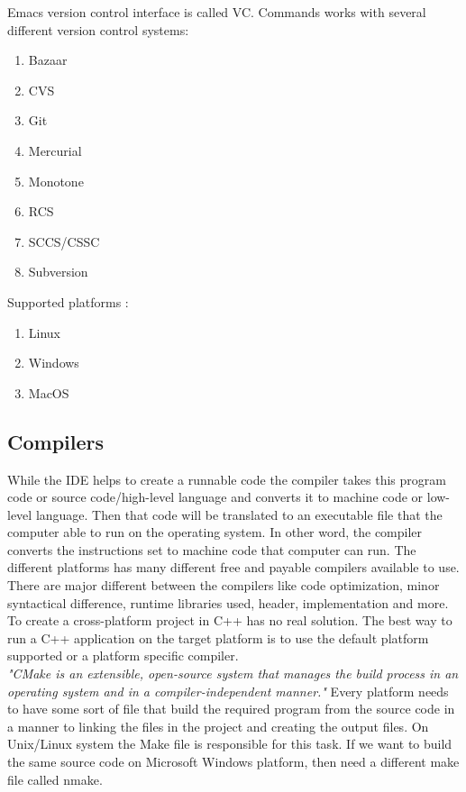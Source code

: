 \documentclass[12pt]{article}
\begin{document}
{{\begin{enumerate}
Emacs version control interface is called VC. Commands works with several different version control systems:
\begin{enumerate}
\item Bazaar
\item CVS
\item Git
\item Mercurial
\item Monotone
\item RCS
\item SCCS/CSSC
\item Subversion
\end{enumerate} 

Supported platforms : 
\begin{enumerate}
\item Linux
\item Windows
\item MacOS
\end{enumerate}

\end{enumerate}
}

\subsection{Compilers}
While the IDE helps to create a runnable code the compiler takes this program code or source code/high-level language and converts it to machine code or low-level language. Then that code will be translated to an executable file that the computer able to run on the operating system. In other word, the compiler converts the instructions set to machine code that computer can run. The different platforms has many different free and payable compilers available to use. There are  major different between the compilers like code optimization, minor syntactical difference, runtime libraries used, header, implementation and more.\cite{Bolton}\\

To create a cross-platform project in C++ has no real solution. The best way to run a C++ application on the target platform is to use the default platform supported or a platform specific compiler.\\

\textit{"CMake is an extensible, open-source system that manages the build process in an operating system and in a compiler-independent manner."\cite{CMake}} Every platform needs to have some sort of file that build the required program from the source code in a manner to linking the files in the project and creating the output files. On Unix/Linux system the Make file is responsible for this task. If we want to build the same source code on Microsoft Windows platform, then need a different make file called nmake.\\

}
\end{document}
